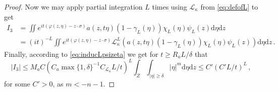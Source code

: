 \documentclass[
	fontsize=11pt, 
	twoside=false, 
	abstract=true, 
	a4paper,
]{scrartcl}
\newcommand{\dd}{\mathrm{d}}
\newcommand{\abs}[1]{\left\lvert#1\right\rvert}
\newcommand{\supp}{\mathrm{supp}}
\newcommand{\td}[1]{\tilde{#1}}
\newcommand{\an}{\quad\text{and}\quad}
\begin{document}
\begin{proof}
	Now we may apply partial integration $L$ times using $\mathcal{L}_\kappa$ from \cref{eq:defofL} to get
	\begin{align*}
		I_3 &= \iint e^{it(\varphi(z,\eta)-z\cdot \sigma)} a(z,t\eta)(1-\gamma_L(\eta))\chi_L(\eta)\psi_L(z)\dd\eta\dd z \\
		&= (it)^{-L}\iint e^{it(\varphi(z,\eta)-z\cdot \sigma)} \mathcal{L}_{\kappa}^L\left(a(z,t\eta)(1-\gamma_L(\eta))\chi_L(\eta)\psi_L(z)\right)\dd\eta\dd z\,.
	\end{align*}
%
%
	Finally, according to \cref{eq:inducLpsizeta} we get for $t \geq R_aL/\delta$ that
	\[
		\abs{I_{3}} \leq M_a C (C_a\max\{1,\delta\}^{-1}C_{\mathcal{L}_\kappa}L/t)^L\int_Z\int_{\abs{\eta}\geq \delta} \abs{\eta}^{m} \dd\eta \dd z \leq C'(C'L/t)^L\,,
	\]
	for some $C'>0$, as $m<-n-1$.


\end{proof}
\end{document}
